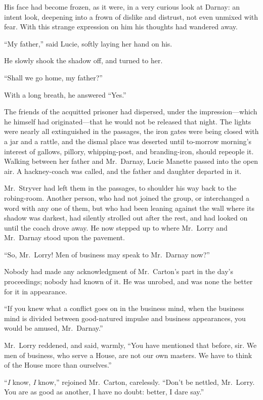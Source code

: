 His face had become frozen, as it were, in a very curious look at
Darnay:  an intent look, deepening into a frown of dislike and distrust,
not even unmixed with fear.  With this strange expression on him his
thoughts had wandered away.

``My father,'' said Lucie, softly laying her hand on his.

He slowly shook the shadow off, and turned to her.

``Shall we go home, my father?''

With a long breath, he answered ``Yes.''

The friends of the acquitted prisoner had dispersed, under the
impression---which he himself had originated---that he would not be
released that night.  The lights were nearly all extinguished in the
passages, the iron gates were being closed with a jar and a rattle,
and the dismal place was deserted until to-morrow morning's interest
of gallows, pillory, whipping-post, and branding-iron, should repeople
it.  Walking between her father and Mr.\ Darnay, Lucie Manette passed
into the open air.  A hackney-coach was called, and the father and
daughter departed in it.

Mr.\ Stryver had left them in the passages, to shoulder his way back
to the robing-room.  Another person, who had not joined the group,
or interchanged a word with any one of them, but who had been leaning
against the wall where its shadow was darkest, had silently strolled
out after the rest, and had looked on until the coach drove away.
He now stepped up to where Mr.\ Lorry and Mr.\ Darnay stood upon the
pavement.

``So, Mr.\ Lorry!  Men of business may speak to Mr.\ Darnay now?''

Nobody had made any acknowledgment of Mr.\ Carton's part in the day's
proceedings; nobody had known of it.  He was unrobed, and was none
the better for it in appearance.

``If you knew what a conflict goes on in the business mind, when the
business mind is divided between good-natured impulse and business
appearances, you would be amused, Mr.\ Darnay.''

Mr.\ Lorry reddened, and said, warmly, ``You have mentioned that before,
sir.  We men of business, who serve a House, are not our own masters.
We have to think of the House more than ourselves.''

``\emph{I} know, \emph{I} know,'' rejoined Mr.\ Carton, carelessly.  ``Don't be
nettled, Mr.\ Lorry.  You are as good as another, I have no doubt:
better, I dare say.''

